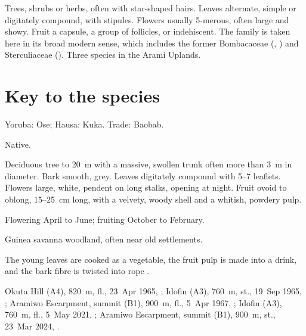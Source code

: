\label{fam:malvaceae}

Trees, shrubs or herbs, often with star-shaped hairs. Leaves
alternate, simple or digitately compound, with stipules. Flowers
usually 5-merous, often large and showy. Fruit a capsule, a group of
follicles, or indehiscent. The family is taken here in its broad
modern sense, which includes the former Bombacaceae
(, ) and Sterculiaceae ().
Three species in the Arami Uplands.

\section*{Key to the species}
\begin{florakey}
\end{florakey}

\label{sp:MAL01}

 Yoruba: Ose; Hausa: Kuka. Trade:
Baobab.

 Native.

 Deciduous tree to 20~m with a massive, swollen
trunk often more than 3~m in diameter. Bark smooth, grey. Leaves
digitately compound with 5--7 leaflets. Flowers large, white, pendent
on long stalks, opening at night. Fruit ovoid to oblong, 15--25~cm
long, with a velvety, woody shell and a whitish, powdery pulp.

 Flowering April to June; fruiting October to
February.

 Guinea savanna woodland, often near old settlements.

 The young leaves are cooked as a vegetable, the fruit
pulp is made into a drink, and the bark fibre is twisted into rope
\citep{burkill1985,arbonnier2004}.

 Okuta Hill (A4), 820~m, fl., 23~Apr 1965, ;
Idofin (A3), 760~m, st., 19~Sep 1965, ;
Aramiwo Escarpment, summit (B1), 900~m, fl., 5~Apr 1967, ;
Idofin (A3), 760~m, fl., 5~May 2021, ;
Aramiwo Escarpment, summit (B1), 900~m, st., 23~Mar 2024, .


